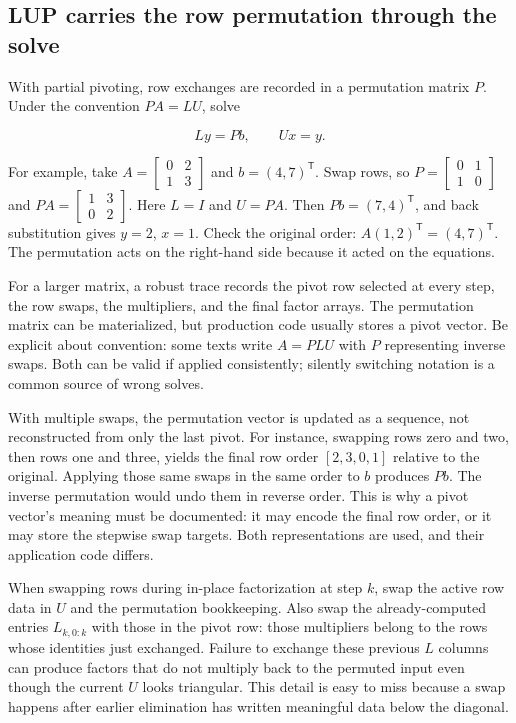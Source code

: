 \subsection{LUP carries the row permutation through the solve}\label{lup-carries-the-row-permutation-through-the-solve}

With partial pivoting, row exchanges are recorded in a permutation matrix \(P\). Under the convention \(PA=LU\), solve

\[
Ly=Pb,\qquad Ux=y.
\]

For example, take \(A=\begin{bmatrix}0&2\\1&3\end{bmatrix}\) and \(b=(4,7)^\mathsf T\). Swap rows, so \(P=\begin{bmatrix}0&1\\1&0\end{bmatrix}\) and \(PA=\begin{bmatrix}1&3\\0&2\end{bmatrix}\). Here \(L=I\) and \(U=PA\). Then \(Pb=(7,4)^\mathsf T\), and back substitution gives \(y=2\), \(x=1\). Check the original order: \(A(1,2)^\mathsf T=(4,7)^\mathsf T\). The permutation acts on the right-hand side because it acted on the equations.

For a larger matrix, a robust trace records the pivot row selected at every step, the row swaps, the multipliers, and the final factor arrays. The permutation matrix can be materialized, but production code usually stores a pivot vector. Be explicit about convention: some texts write \(A=PLU\) with \(P\) representing inverse swaps. Both can be valid if applied consistently; silently switching notation is a common source of wrong solves.

With multiple swaps, the permutation vector is updated as a sequence, not reconstructed from only the last pivot. For instance, swapping rows zero and two, then rows one and three, yields the final row order \([2,3,0,1]\) relative to the original. Applying those same swaps in the same order to \(b\) produces \(Pb\). The inverse permutation would undo them in reverse order. This is why a pivot vector's meaning must be documented: it may encode the final row order, or it may store the stepwise swap targets. Both representations are used, and their application code differs.

When swapping rows during in-place factorization at step \(k\), swap the active row data in \(U\) and the permutation bookkeeping. Also swap the already-computed entries \(L_{k,0:k}\) with those in the pivot row: those multipliers belong to the rows whose identities just exchanged. Failure to exchange these previous \(L\) columns can produce factors that do not multiply back to the permuted input even though the current \(U\) looks triangular. This detail is easy to miss because a swap happens after earlier elimination has written meaningful data below the diagonal.

